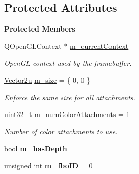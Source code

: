 \subsection*{Protected Attributes}
\begin{Indent}\textbf{ Protected Members}\par
\begin{DoxyCompactItemize}
\item 
\mbox{\label{classrev_1_1_frame_buffer_ab6890fe95669e335f576e0c32266d9b1}} 
Q\+Open\+G\+L\+Context $\ast$ \mbox{\hyperlink{classrev_1_1_frame_buffer_ab6890fe95669e335f576e0c32266d9b1}{m\+\_\+current\+Context}}
\begin{DoxyCompactList}\small\item\em Open\+GL context used by the framebuffer. \end{DoxyCompactList}\item 
\mbox{\label{classrev_1_1_frame_buffer_af679696c31241902e5b62a727d4026dd}} 
\mbox{\hyperlink{classrev_1_1_vector}{Vector2u}} \mbox{\hyperlink{classrev_1_1_frame_buffer_af679696c31241902e5b62a727d4026dd}{m\+\_\+size}} = \{ 0, 0 \}
\begin{DoxyCompactList}\small\item\em Enforce the same size for all attachments. \end{DoxyCompactList}\item 
\mbox{\label{classrev_1_1_frame_buffer_acb1ff171cbcf3c41201aa3787167b572}} 
uint32\+\_\+t \mbox{\hyperlink{classrev_1_1_frame_buffer_acb1ff171cbcf3c41201aa3787167b572}{m\+\_\+num\+Color\+Attachments}} = 1
\begin{DoxyCompactList}\small\item\em Number of color attachments to use. \end{DoxyCompactList}\item 
\mbox{\label{classrev_1_1_frame_buffer_ae80ca23d4a5ebedf4770f763f045408d}} 
bool {\bfseries m\+\_\+has\+Depth}
\item 
\mbox{\label{classrev_1_1_frame_buffer_af43fe1509626fa37c38b284327ef8f92}} 
unsigned int {\bfseries m\+\_\+fbo\+ID} = 0
\item 
\mbox{\label{classrev_1_1_frame_buffer_ae53f95b230b4bf363967c06a81354882}} 

\end{DoxyCompactItemize}
\end{Indent}
